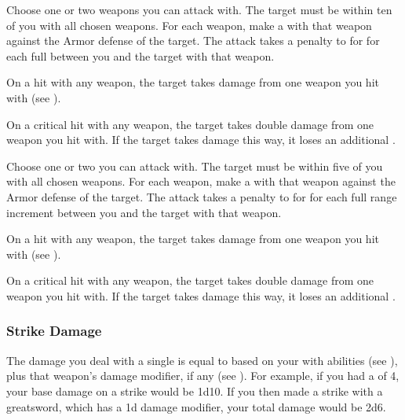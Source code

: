         \begin{freeability}{}
            Choose one or two  weapons you can attack with.
            The target must be within ten  of you with all chosen weapons.
            For each weapon, make a  with that weapon against the Armor defense of the target.
            The attack takes a  penalty to  for for each full  between you and the target with that weapon.

            On a hit with any weapon, the target takes damage from one weapon you hit with (see ).

            On a critical hit with any weapon, the target takes double damage from one weapon you hit with.
            If the target takes damage this way, it loses an additional .
        \end{freeability}

        \begin{freeability}{}
            Choose one or two  you can attack with.
            The target must be within five  of you with all chosen weapons.
            For each weapon, make a  with that weapon against the Armor defense of the target.
            The attack takes a  penalty to  for for each full range increment between you and the target with that weapon.

            On a hit with any weapon, the target takes damage from one weapon you hit with (see ).

            On a critical hit with any weapon, the target takes double damage from one weapon you hit with.
            If the target takes damage this way, it loses an additional .
        \end{freeability}

        \subsubsection{Strike Damage}\label{Strike Damage}
            The damage you deal with a single  is equal to  based on your  with  abilities (see ), plus that weapon's damage modifier, if any (see ).
            For example, if you had a  of 4, your base damage on a strike would be 1d10.
            If you then made a strike with a greatsword, which has a \plus1d damage modifier, your total damage would be 2d6.

